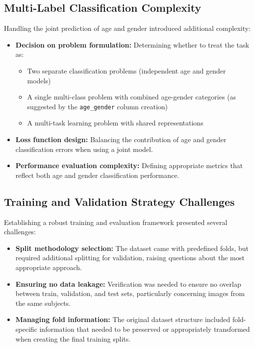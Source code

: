 \documentclass{article}
\begin{document}
\subsection{Multi-Label Classification Complexity}
Handling the joint prediction of age and gender introduced additional complexity:

\begin{itemize}
    \item \textbf{Decision on problem formulation:} Determining whether to treat the task as:
    \begin{itemize}
        \item Two separate classification problems (independent age and gender models)
        \item A single multi-class problem with combined age-gender categories (as suggested by the \texttt{age\_gender} column creation)
        \item A multi-task learning problem with shared representations
    \end{itemize}

    \item \textbf{Loss function design:} Balancing the contribution of age and gender classification errors when using a joint model.

    \item \textbf{Performance evaluation complexity:} Defining appropriate metrics that reflect both age and gender classification performance.
\end{itemize}

\subsection{Training and Validation Strategy Challenges}
Establishing a robust training and evaluation framework presented several challenges:

\begin{itemize}
    \item \textbf{Split methodology selection:} The dataset came with predefined folds, but required additional splitting for validation, raising questions about the most appropriate approach.

    \item \textbf{Ensuring no data leakage:} Verification was needed to ensure no overlap between train, validation, and test sets, particularly concerning images from the same subjects.

    \item \textbf{Managing fold information:} The original dataset structure included fold-specific information that needed to be preserved or appropriately transformed when creating the final training splits.
\end{itemize}
\end{document}
